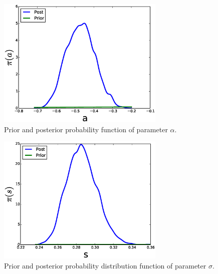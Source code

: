 \documentclass{article}
\begin{document}
\begin{figure}[H]
\begin{centering}
\includegraphics[width=8cm]{figs/a_post} 
\par\end{centering}

\caption{Prior and posterior probability function of parameter $\alpha$. }


\label{fig:Uc} 
\end{figure}


\begin{figure}[H]
\begin{centering}
\includegraphics[width=8cm]{figs/s_post} 
\par\end{centering}

\caption{Prior and posterior probability distribution function of parameter
$\sigma$.}


\label{fig:Uc} 
\end{figure}
\end{document}

